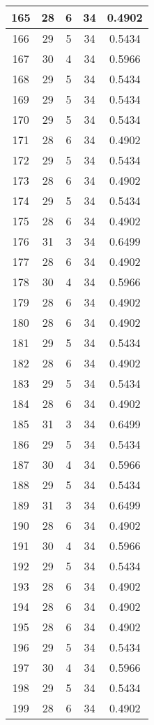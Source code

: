 \documentclass[letterpaper, 12pt]{article}
\begin{document}
\begin{longtable}{|c|c|c|c|c|}
\hline
165 & 28 & 6 & 34 & 0.4902 \\
\hline
166 & 29 & 5 & 34 & 0.5434 \\
\hline
167 & 30 & 4 & 34 & 0.5966 \\
\hline
168 & 29 & 5 & 34 & 0.5434 \\
\hline
169 & 29 & 5 & 34 & 0.5434 \\
\hline
170 & 29 & 5 & 34 & 0.5434 \\
\hline
171 & 28 & 6 & 34 & 0.4902 \\
\hline
172 & 29 & 5 & 34 & 0.5434 \\
\hline
173 & 28 & 6 & 34 & 0.4902 \\
\hline
174 & 29 & 5 & 34 & 0.5434 \\
\hline
175 & 28 & 6 & 34 & 0.4902 \\
\hline
176 & 31 & 3 & 34 & 0.6499 \\
\hline
177 & 28 & 6 & 34 & 0.4902 \\
\hline
178 & 30 & 4 & 34 & 0.5966 \\
\hline
179 & 28 & 6 & 34 & 0.4902 \\
\hline
180 & 28 & 6 & 34 & 0.4902 \\
\hline
181 & 29 & 5 & 34 & 0.5434 \\
\hline
182 & 28 & 6 & 34 & 0.4902 \\
\hline
183 & 29 & 5 & 34 & 0.5434 \\
\hline
184 & 28 & 6 & 34 & 0.4902 \\
\hline
185 & 31 & 3 & 34 & 0.6499 \\
\hline
186 & 29 & 5 & 34 & 0.5434 \\
\hline
187 & 30 & 4 & 34 & 0.5966 \\
\hline
188 & 29 & 5 & 34 & 0.5434 \\
\hline
189 & 31 & 3 & 34 & 0.6499 \\
\hline
190 & 28 & 6 & 34 & 0.4902 \\
\hline
191 & 30 & 4 & 34 & 0.5966 \\
\hline
192 & 29 & 5 & 34 & 0.5434 \\
\hline
193 & 28 & 6 & 34 & 0.4902 \\
\hline
194 & 28 & 6 & 34 & 0.4902 \\
\hline
195 & 28 & 6 & 34 & 0.4902 \\
\hline
196 & 29 & 5 & 34 & 0.5434 \\
\hline
197 & 30 & 4 & 34 & 0.5966 \\
\hline
198 & 29 & 5 & 34 & 0.5434 \\
\hline
199 & 28 & 6 & 34 & 0.4902 \\
\hline
\end{longtable}
\end{document}
